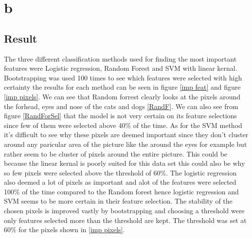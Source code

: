 \documentclass{article}
\begin{document}
\section{b}
\subsection{Result}
The three different classification methods used for finding the most important features were Logistic regression, Random Forest and SVM with linear kernal. Bootstrapping was used 100 times to see which features were selected with high certainty the results for each method can be seen in figure \ref{imp feat} and figure \ref{imp pixels}. We can see that Random forrest clearly looks at the pixels around the forhead, eyes and nose of the cats and dogs \ref{RandF}. We can also see from figure \ref{RandForSel} that the model is not very certain on its feature selections since few of them were selected above 40\% of the time. As for the SVM method it's difficult to see why these pixels are deemed important since they don't cluster around any paricular area of the picture like the around the eyes for example but rather seem to be cluster of pixels around the entire picture. This could be because the linear kernal is poorly suited for this data set this could also be why so few pixels were selected above the threshold of 60\%. The logistic regression also deemed a lot of pixels as important and alot of the features were selected 100\% of the time compared to the Random forest hence logistic regression and SVM seems to be more certain in their feature selection.  The stability of the chosen pixels is improved vastly by bootstrapping and choosing a threshold were only features selected more than the threshold are kept. The threshold was set at 60\% for the pixels shown in \ref{imp pixels}.
\end{document}
